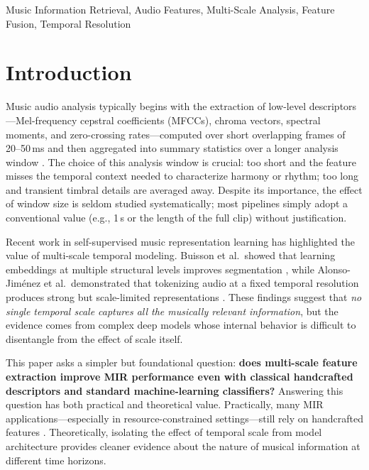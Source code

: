 \documentclass[conference]{IEEEtran}
\begin{document}
\begin{IEEEkeywords}
Music Information Retrieval, Audio Features, Multi-Scale Analysis, Feature Fusion, Temporal Resolution
\end{IEEEkeywords}

\section{Introduction}

Music audio analysis typically begins with the extraction of low-level descriptors---Mel-frequency cepstral coefficients (MFCCs), chroma vectors, spectral moments, and zero-crossing rates---computed over short overlapping frames of 20--50\,ms and then aggregated into summary statistics over a longer analysis window \cite{muller2015fundamentals, lerch2012introduction}.
The choice of this analysis window is crucial: too short and the feature misses the temporal context needed to characterize harmony or rhythm; too long and transient timbral details are averaged away.
Despite its importance, the effect of window size is seldom studied systematically; most pipelines simply adopt a conventional value (e.g., 1\,s or the length of the full clip) without justification.

Recent work in self-supervised music representation learning has highlighted the value of multi-scale temporal modeling.
Buisson et al.\ showed that learning embeddings at multiple structural levels improves segmentation \cite{buisson2024self}, while Alonso-Jim\'enez et al.\ demonstrated that tokenizing audio at a fixed temporal resolution produces strong but scale-limited representations \cite{alonso2025omar}.
These findings suggest that \emph{no single temporal scale captures all the musically relevant information}, but the evidence comes from complex deep models whose internal behavior is difficult to disentangle from the effect of scale itself.

This paper asks a simpler but foundational question: \textbf{does multi-scale feature extraction improve MIR performance even with classical handcrafted descriptors and standard machine-learning classifiers?}
Answering this question has both practical and theoretical value.
Practically, many MIR applications---especially in resource-constrained settings---still rely on handcrafted features \cite{ding2023audio, tamm2024comparative}.
Theoretically, isolating the effect of temporal scale from model architecture provides cleaner evidence about the nature of musical information at different time horizons.
\end{document}
